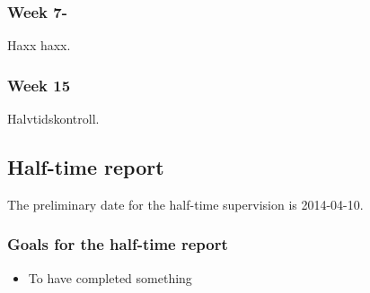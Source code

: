 \subsubsection{Week 7-}

Haxx haxx.

\subsubsection{Week 15}

Halvtidskontroll.


\subsection{Half-time report}
The preliminary date for the half-time supervision is 2014-04-10.


\subsubsection{Goals for the half-time report}

\begin{itemize}
  \item To have completed something
\end{itemize}
